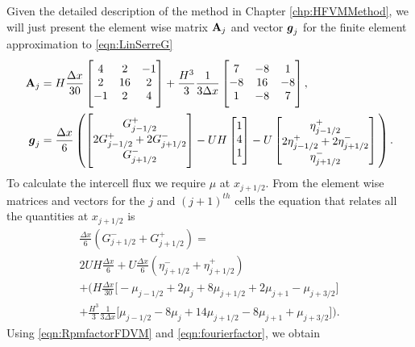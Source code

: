 Given the detailed description of the method in Chapter \ref{chp:HFVMMethod}, we will just present the element wise matrix $\mathbf{A}_j$ and vector $\boldsymbol{g}_j$ for the finite element approximation to \eqref{eqn:LinSerreG} 
\begin{align*}
\matr{A}_j &= H \frac{\Delta x}{30 } \begin{bmatrix} \TM 4 &2 &-1 \\2 &16 &2  \\-1 &2 &4 \BM \end{bmatrix} +  \frac{H^3 }{3} \frac{1 }{3\Delta x}\begin{bmatrix} \TM 7 &-8 &1  \\-8 &16 &-8  \\1 &-8 &7 \BM \end{bmatrix}, \\
\vecn{g}_j &=  \frac{\Delta x}{6} \left(\begin{bmatrix} \TM G^+_{j -1/2} \\2 G^+_{j -1/2}+2 G^-_{j +1/2} \\ G^-_{j +1/2} \BM \end{bmatrix} - UH\begin{bmatrix} \TM 1 \\4 \\ 1  \BM\end{bmatrix} - U\begin{bmatrix} \TM \eta^+_{j -1/2} \\2 \eta^+_{j -1/2}+2 \eta^-_{j +1/2} \\ \eta^-_{j +1/2} \end{bmatrix} \BM \right).
\end{align*}
To calculate the intercell flux we require $\mu$ at $x_{j+1/2}$. From the element wise matrices and vectors for the $j$ and $\left(j+1\right)^{th}$ cells the equation that relates all the quantities at $x_{j+1/2}$ is
\begin{multline*}
\frac{\Delta x}{6} \left(G^-_{j +1/2} + G^+_{j +1/2} \right)= \\
2UH \frac{\Delta x}{6}   + U\frac{\Delta x}{6} \left(\eta^-_{j +1/2} + \eta^+_{j +1/2} \right) \\ +   \Bigg(H\frac{\Delta x}{30} \Bigg[ -\mu_{j-1/2} +  2\mu_{j} + 8\mu_{j+1/2}  +  2 \mu_{j+1}  - \mu_{j+3/2}\Bigg]   \\ + \frac{H^3 }{3}\frac{1 }{3\Delta x} \Bigg[  \mu_{j-1/2} -8\mu_{j} + 14 \mu_{j+1/2} -8\mu_{j+1} + \mu_{j+3/2}  \Bigg]    \Bigg).
\end{multline*}
Using \eqref{eqn:RpmfactorFDVM} and \eqref{eqn:fourierfactor}, we obtain
